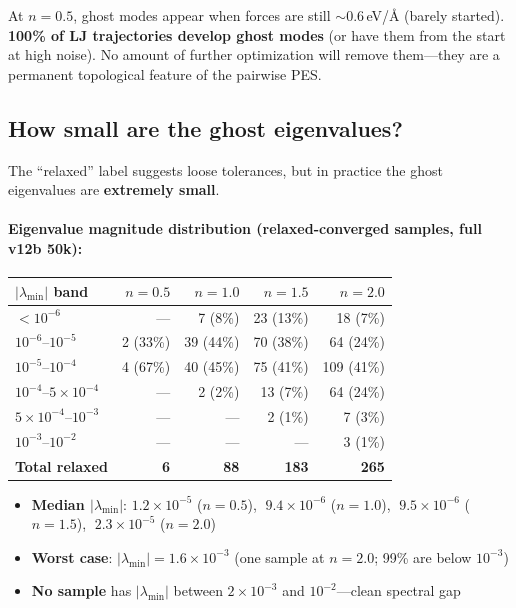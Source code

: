 \documentclass[11pt,a4paper]{article}
\theoremstyle{definition}
\begin{document}
\noindent
At $n{=}0.5$, ghost modes appear when forces are still ${\sim}0.6$\,eV/\AA{}
(barely started).  \textbf{100\% of LJ trajectories develop ghost modes}
(or have them from the start at high noise).  No amount of further
optimization will remove them---they are a permanent topological feature
of the pairwise PES.

\subsection{How small are the ghost eigenvalues?}
\label{sec:eval-magnitudes}

The ``relaxed'' label suggests loose tolerances, but in practice the
ghost eigenvalues are \textbf{extremely small}.

\paragraph{Eigenvalue magnitude distribution (relaxed-converged samples, full v12b 50k):}

\begin{center}\small
\begin{tabular}{l rrrr}
\toprule
$|\lambda_\text{min}|$ band
  & $n{=}0.5$ & $n{=}1.0$ & $n{=}1.5$ & $n{=}2.0$ \\
\midrule
$< 10^{-6}$       &  --- & 7 (8\%)   & 23 (13\%) & 18 (7\%)  \\
$10^{-6}$--$10^{-5}$  &  2 (33\%) & 39 (44\%) & 70 (38\%) & 64 (24\%) \\
$10^{-5}$--$10^{-4}$  &  4 (67\%) & 40 (45\%) & 75 (41\%) & 109 (41\%) \\
$10^{-4}$--$5{\times}10^{-4}$ & --- & 2 (2\%)   & 13 (7\%)  & 64 (24\%) \\
$5{\times}10^{-4}$--$10^{-3}$ & --- & ---       & 2 (1\%)   & 7 (3\%)   \\
$10^{-3}$--$10^{-2}$ & --- & ---       & ---       & 3 (1\%)   \\
\midrule
\textbf{Total relaxed} & \textbf{6} & \textbf{88} & \textbf{183} & \textbf{265} \\
\bottomrule
\end{tabular}
\end{center}

\begin{tcolorbox}[finding, title=Key numbers: ghost eigenvalues]
\begin{itemize}[nosep,leftmargin=*]
  \item \textbf{Median $|\lambda_\text{min}|$}: $1.2 \times 10^{-5}$ ($n{=}0.5$),
    $\;9.4 \times 10^{-6}$ ($n{=}1.0$),
    $\;9.5 \times 10^{-6}$ ($n{=}1.5$),
    $\;2.3 \times 10^{-5}$ ($n{=}2.0$)
  \item \textbf{Worst case}: $|\lambda_\text{min}| = 1.6 \times 10^{-3}$
    (one sample at $n{=}2.0$; 99\% are below $10^{-3}$)
  \item \textbf{No sample} has $|\lambda_\text{min}|$ between $2 \times 10^{-3}$
    and $10^{-2}$---clean spectral gap
\end{itemize}
\end{tcolorbox}
\end{document}
